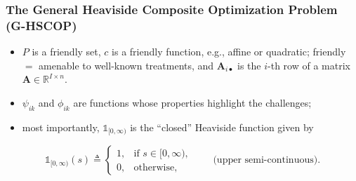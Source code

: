 \documentclass[aspectratio=169,xcolor=dvipsnames]{beamer}
\begin{document}
\begin{frame}
  \frametitle{The General Heaviside Composite Optimization Problem\\[-1pt]
    {\normalsize\mdseries (G-HSCOP)}}

  \begingroup
  \setlength{\fboxsep}{0.10cm}
  \setlength{\fboxrule}{0.45pt}
  \color{MediumBlack}
  \noindent\fbox{%
    \begin{minipage}{0.94\textwidth}
      \color{MediumBlue}
      \vspace{-0.05cm}
      \noindent\makebox[\linewidth][c]{\(\displaystyle
        \operatorname*{\textbf{maximize}}_{\mathbf{x}\in P}\quad
        \Phi(\mathbf{x})\triangleq c(\mathbf{x})
        +\sum_{k=1}^{K_0}\psi_{0k}(\mathbf{x})
        \underbrace{\mathds{1}_{[0,\infty)}\!\left(\phi_{0k}(\mathbf{x})\right)}_
          {\text{composite indicator fnc.}}
      \)}\par
      \vspace{0.05cm}
      \noindent\makebox[\linewidth][c]{\(\displaystyle
        \operatorname*{\textbf{subject to}}\quad
        \mathbf{A}_{i\bullet}\mathbf{x}
        +\sum_{k=1}^{K_i}\psi_{ik}(\mathbf{x})
        \mathds{1}_{[0,\infty)}\!\left(\phi_{ik}(\mathbf{x})\right)
        \geq \eta_i,\qquad i=1,\ldots,I.
      \)}\par
      \vspace{-0.05cm}
    \end{minipage}%
  }
  \endgroup

  \vspace{0.08cm}
  \footnotesize
  \begin{itemize}
    \setlength{\itemsep}{0.02cm}
    \item $P$ is a \textcolor{MediumRed}{friendly} set, $c$ is a
      \textcolor{MediumRed}{friendly} function, e.g., affine or quadratic;
      \textcolor{MediumRed}{friendly} $=$ amenable to well-known treatments,
      and $\mathbf{A}_{i\bullet}$ is the $i$-th row of a matrix
      $\mathbf{A}\in\mathbb{R}^{I\times n}$.
    \item $\psi_{ik}$ and $\phi_{ik}$ are functions whose properties highlight
      the challenges;
    \item most importantly, $\mathds{1}_{[0,\infty)}$ is the ``closed''
      Heaviside function given by
  \end{itemize}

  \vspace{-0.16cm}
  {\color{MediumBlue}\small
  \[
    \mathds{1}_{[0,\infty)}(s)\triangleq
    \begin{cases}
      1, & \text{if }s\in[0,\infty),\\
      0, & \text{otherwise},
    \end{cases}
    \qquad\text{(upper semi-continuous).}
  \]
  }
\end{frame}
\end{document}
